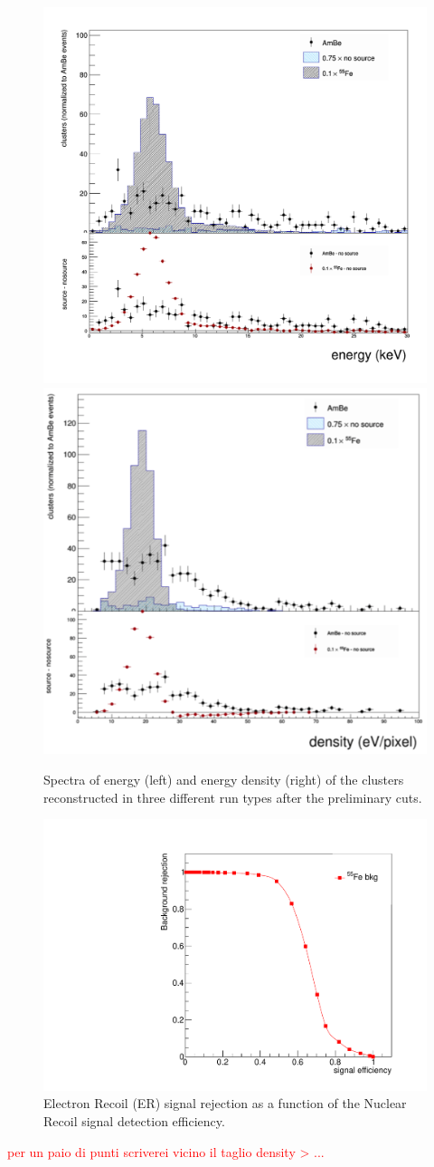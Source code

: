 \documentclass[12pt]{iopart}
\begin{document}
 
\begin{figure}[ht]
	\centering
	\includegraphics[width=0.45\linewidth]{energy_spectrum.png}
	\includegraphics[width=0.45\linewidth]{density_spectrum.png}
  	\caption{Spectra of energy (left) and energy density (right) of the clusters reconstructed in three different run types after the preliminary cuts.}
  	\label{fig:ene&dens}
\end{figure}

\begin{figure}[ht]
	\centering
	\includegraphics[width=0.50\linewidth]{density_roc.pdf}
  	\caption{Electron Recoil (ER) signal rejection as a function of the Nuclear Recoil signal detection efficiency.}
  	\label{fig:roc}
\end{figure}
\textcolor{red}{per un paio di punti scriverei vicino il taglio density > ...}
\end{document}
